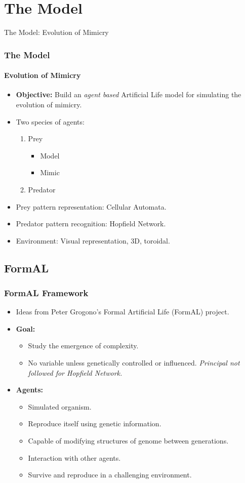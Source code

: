 \section{The Model}

\frame
{
	\begin{center}
		\LARGE The Model: Evolution of Mimicry
	\end{center}
}

\frame
{
	\frametitle{The Model}
	\framesubtitle{Evolution of Mimicry}
	
	\begin{itemize}
		\item \textbf{Objective:} Build an \textit{agent based} Artificial Life model for simulating the evolution of mimicry.	
		\item Two species of agents:
			\begin{enumerate}
				\item Prey
					\begin{itemize}
						\item Model
						\item Mimic
					\end{itemize}
				\item Predator
			\end{enumerate}
		\item Prey pattern representation: Cellular Automata.
		\item Predator pattern recognition: Hopfield Network.
		\item Environment: Visual representation, 3D, toroidal.
	\end{itemize}	
}

\subsection{FormAL}

\frame
{
	\frametitle{FormAL Framework}
	
	\begin{itemize}
		\item Ideas from Peter Grogono's Formal Artificial Life (FormAL) project.
		\item \textbf{Goal:}		
			\begin{itemize}
				\item Study the emergence of complexity.
				\item No variable unless genetically controlled or influenced. \textit{Principal not followed for Hopfield Network.}
			\end{itemize}
		\item \textbf{Agents:}
			\begin{itemize}
				\item Simulated organism.
				\item Reproduce itself using genetic information.
				\item Capable of modifying structures of genome between generations.
				\item Interaction with other agents.
				\item Survive and reproduce in a challenging environment.
			\end{itemize}
	\end{itemize}
	
}

